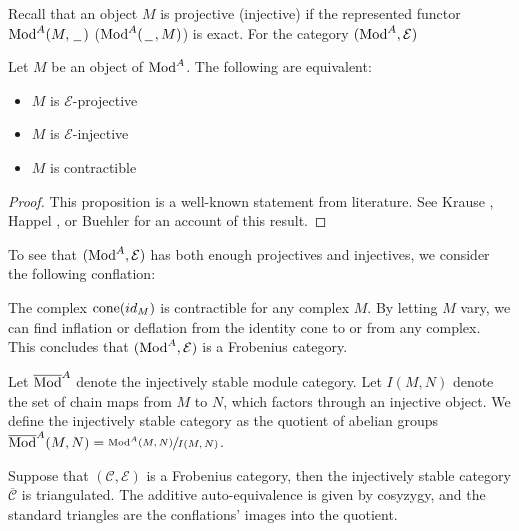 \documentclass[../thesis.tex]{subfiles}
\begin{document}
            Recall that an object $M$ is projective (injective) if the represented functor $\tt{Mod}^A(M,\argument)$ ($\tt{Mod}^A(\argument,M)$) is exact. For the category $(\tt{Mod}^A, \mathcal{E})$

            \begin{proposition}
                Let $M$ be an object of $\tt{Mod}^A$. The following are equivalent:
                \begin{itemize}
                    \item $M$ is $\mathcal{E}$-projective
                    \item $M$ is $\mathcal{E}$-injective
                    \item $M$ is contractible
                \end{itemize}
            \end{proposition}

            \begin{proof}
                This proposition is a well-known statement from literature. See Krause \cite{Krause21}, Happel \cite{Happel88}, or Buehler \cite{Buhler10} for an account of this result.
            \end{proof}

            To see that $(\tt{Mod}^A, \mathcal{E})$ has both enough projectives and injectives, we consider the following conflation:

            \begin{center}
            \end{center}

            The complex $\tt{cone}(id_M)$ is contractible for any complex $M$. By letting $M$ vary, we can find inflation or deflation from the identity cone to or from any complex. This concludes that $(\tt{Mod}^A, \mathcal{E})$ is a Frobenius category.
            
            Let $\overline{\tt{Mod}}^A$ denote the injectively stable module category. Let $I(M, N)$ denote the set of chain maps from $M$ to $N$, which factors through an injective object. We define the injectively stable category as the quotient of abelian groups $\overline{\tt{Mod}}^A(M, N)=\sfrac{\tt{Mod}^A(M, N)}{I(M, N)}$.

            \begin{thm}
                Suppose that $(\mathcal{C},\mathcal{E})$ is a Frobenius category, then the injectively stable category $\overline{\mathcal{C}}$ is triangulated. The additive auto-equivalence is given by cosyzygy, and the standard triangles are the conflations' images into the quotient.
            \end{thm}
\end{document}
